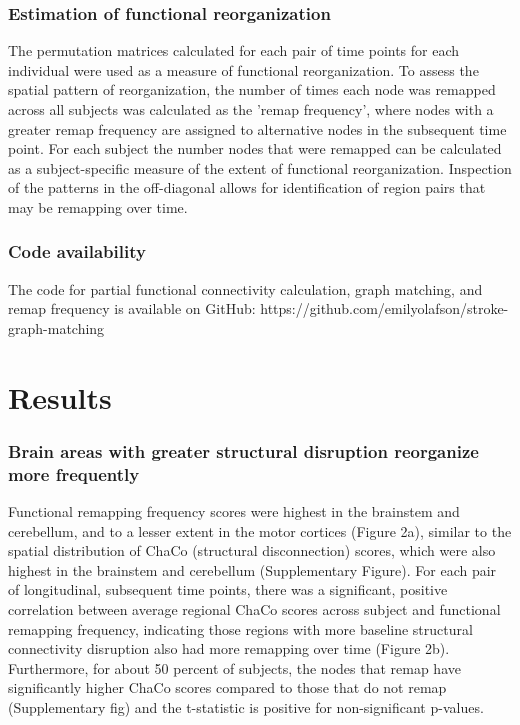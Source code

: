 \documentclass[10pt]{article}
\begin{document}
	\subsubsection*{Estimation of functional reorganization}
	The permutation matrices calculated for each pair of time points for each individual were used as a measure of functional reorganization. To assess the spatial pattern of reorganization, the number of times each node was remapped across all subjects was calculated as the 'remap frequency’, where nodes with a greater remap frequency are assigned to alternative nodes in the subsequent time point. For each subject the number nodes that were remapped can be calculated as a subject-specific measure of the extent of functional reorganization. Inspection of the patterns in the off-diagonal allows for identification of region pairs that may be remapping over time.
	
	\subsubsection*{Code availability}
	 The code for partial functional connectivity calculation, graph matching, and remap frequency is available on GitHub: https://github.com/emilyolafson/stroke-graph-matching
	
	\section*{Results}
	\subsubsection*{Brain areas with greater structural disruption reorganize more frequently}
	Functional remapping frequency scores were highest in the brainstem and cerebellum, and to a lesser extent in the motor cortices (Figure 2a), similar to the spatial distribution of ChaCo (structural disconnection) scores, which were also highest in the brainstem and cerebellum (Supplementary Figure). For each pair of longitudinal, subsequent time points, there was a significant, positive correlation between average regional ChaCo scores across subject and functional remapping frequency, indicating those regions with more baseline structural connectivity disruption also had more remapping over time (Figure 2b).
	Furthermore, for about 50 percent of subjects, the nodes that remap have significantly higher ChaCo scores compared to those that do not remap (Supplementary fig) and the t-statistic is positive for non-significant p-values. 
\end{document}

